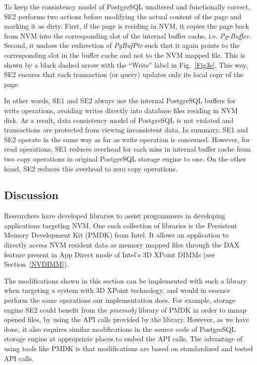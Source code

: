 To keep the consistency model of PostgreSQL unaltered and functionally correct,
SE2 performs two actions before modifying the 
actual content of the page and marking it as dirty. First, if the page is residing in NVM, it copies the page back from NVM into the 
corresponding slot of the internal buffer cache, i.e. \textit{Pg-Buffer}. Second, it undoes the redirection of \textit{PgBufPtr} such that it 
again points to the corresponding slot in the buffer cache and not to the NVM mapped file. This is shown by a black dashed arrow with 
the ``Write'' label in Fig.~\ref{Fig3c}. This way, SE2 ensures that each transaction (or query) updates only its local copy of the page.

In other words, SE1 and SE2 always use the internal PostgreSQL  buffers for write operations, avoiding writes directly into  database files residing in NVM disk. As a result,  data consistency model of PostgreSQL is not violated and transactions are protected from viewing inconsistent data. In summary, SE1 and SE2 operate in the same way as far as write operation is concerned. However, for read operations, SE1 reduces overhead for each miss in internal buffer cache from two copy operations in original PostgreSQL storage engine to one. On the other hand, SE2 reduces this overhead to zero copy operations.

\subsection{Discussion}

Researchers have developed libraries to assist programmers in developing applications targeting NVM. One such collection of libraries is the Persistent Memory Development Kit (PMDK) \cite{PMDKLib} from Intel. It allows an application to directly access NVM resident data as memory mapped files through the DAX feature present in App Direct mode of Intel's 3D XPoint DIMMs (see Section~\ref{NVDIMM}).

The modifications shown in this section can be implemented with such a library when targeting a system with 3D XPoint technology, and would in essence perform the same operations our implementation does. For example, storage engine SE2 could benefit from the \textit{pmemobj} library of PMDK in order to mmap opened files, by using the API calls provided by the library. However, as we have done, it also requires similar modifications in the source code of PostgreSQL storage engine at appropriate places to embed the API calls. The advantage of using tools like PMDK is that modifications are based on standardized and tested API calls.